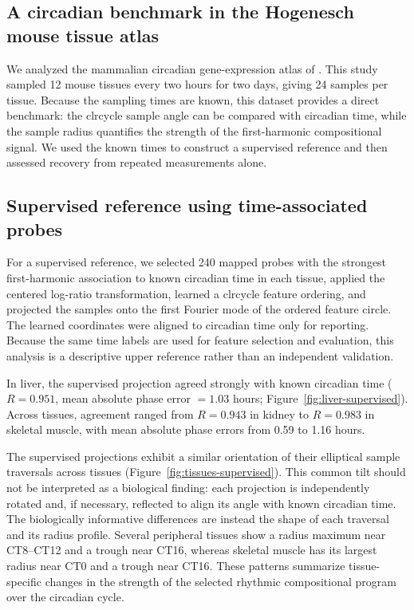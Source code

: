\documentclass[10pt,twocolumn]{article}
\begin{document}
\subsection{A circadian benchmark in the Hogenesch mouse tissue atlas}

We analyzed the mammalian circadian gene-expression atlas of
\citet{Zhang_2014}. This study sampled 12 mouse tissues every two hours for two
days, giving 24 samples per tissue. Because the sampling times are known, this
dataset provides a direct benchmark: the clrcycle sample angle can be compared with
circadian time, while the sample radius quantifies the strength of the
first-harmonic compositional signal. We used the known times to construct a
supervised reference and then assessed recovery from repeated measurements alone.

\subsection{Supervised reference using time-associated probes}

For a supervised reference, we selected 240 mapped probes with the strongest
first-harmonic association to known circadian time in each tissue, applied the
centered log-ratio transformation, learned a clrcycle feature ordering, and projected
the samples onto the first Fourier mode of the ordered feature circle. The
learned coordinates were aligned to circadian time only for reporting. Because
the same time labels are used for feature selection and evaluation, this analysis
is a descriptive upper reference rather than an independent validation.

In liver, the supervised projection agreed strongly with known circadian time
(\(R=0.951\), mean absolute phase error \(=1.03\) hours; Figure~\ref{fig:liver-supervised}).
Across tissues, agreement ranged from \(R=0.943\) in kidney to \(R=0.983\) in
skeletal muscle, with mean absolute phase errors from 0.59 to 1.16 hours.

The supervised projections exhibit a similar orientation of their elliptical
sample traversals across tissues (Figure~\ref{fig:tissues-supervised}). This
common tilt should not be interpreted as a biological finding: each projection
is independently rotated and, if necessary, reflected to align its angle with
known circadian time. The biologically informative differences are instead the
shape of each traversal and its radius profile. Several peripheral tissues show
a radius maximum near CT8--CT12 and a trough near CT16, whereas skeletal muscle
has its largest radius near CT0 and a trough near CT16. These patterns summarize
tissue-specific changes in the strength of the selected rhythmic compositional
program over the circadian cycle.
\end{document}
